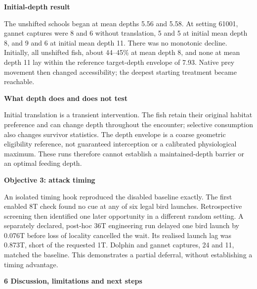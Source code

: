 \documentclass[10pt,a4paper]{article}
\begin{document}
\hfill
\begin{minipage}[t]{238.10999999999999pt}\vspace{0pt}
\textbf{Initial-depth result}\par The unshifted schools began at mean depths 5.56 and 5.58. At setting 61001, gannet captures were 8 and 6 without translation, 5 and 5 at initial mean depth 8, and 9 and 6 at initial mean depth 11. There was no monotonic decline. Initially, all unshifted fish, about 44--45\% at mean depth 8, and none at mean depth 11 lay within the reference target-depth envelope of 7.93. Native prey movement then changed accessibility; the deepest starting treatment became reachable.\par\smallskip
\textbf{What depth does and does not test}\par Initial translation is a transient intervention. The fish retain their original habitat preference and can change depth throughout the encounter; selective consumption also changes survivor statistics. The depth envelope is a coarse geometric eligibility reference, not guaranteed interception or a calibrated physiological maximum. These runs therefore cannot establish a maintained-depth barrier or an optimal feeding depth.\par\smallskip
\textbf{Objective 3: attack timing}\par An isolated timing hook reproduced the disabled baseline exactly. The first enabled 8T check found no cue at any of six legal bird launches. Retrospective screening then identified one later opportunity in a different random setting. A separately declared, post-hoc 36T engineering run delayed one bird launch by 0.076T before loss of locality cancelled the wait. Its realised launch lag was 0.873T, short of the requested 1T. Dolphin and gannet captures, 24 and 11, matched the baseline. This demonstrates a partial deferral, without establishing a timing advantage.\par\smallskip
\end{minipage}
\clearpage
{\large\bfseries 6 Discussion, limitations and next steps\par}\vspace{7pt}
\end{document}
